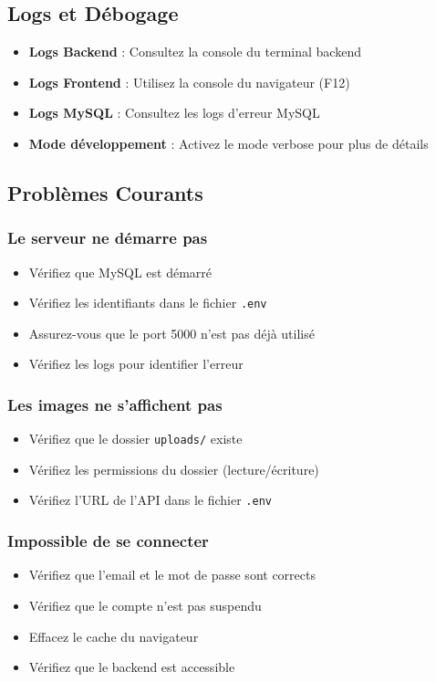 \documentclass[12pt,a4paper]{article}
\begin{document}
\subsection{Logs et Débogage}

\begin{itemize}[leftmargin=*]
    \item \textbf{Logs Backend} : Consultez la console du terminal backend
    \item \textbf{Logs Frontend} : Utilisez la console du navigateur (F12)
    \item \textbf{Logs MySQL} : Consultez les logs d'erreur MySQL
    \item \textbf{Mode développement} : Activez le mode verbose pour plus de détails
\end{itemize}

\subsection{Problèmes Courants}

\subsubsection{Le serveur ne démarre pas}
\begin{itemize}[leftmargin=*]
    \item Vérifiez que MySQL est démarré
    \item Vérifiez les identifiants dans le fichier \texttt{.env}
    \item Assurez-vous que le port 5000 n'est pas déjà utilisé
    \item Vérifiez les logs pour identifier l'erreur
\end{itemize}

\subsubsection{Les images ne s'affichent pas}
\begin{itemize}[leftmargin=*]
    \item Vérifiez que le dossier \texttt{uploads/} existe
    \item Vérifiez les permissions du dossier (lecture/écriture)
    \item Vérifiez l'URL de l'API dans le fichier \texttt{.env}
\end{itemize}

\subsubsection{Impossible de se connecter}
\begin{itemize}[leftmargin=*]
    \item Vérifiez que l'email et le mot de passe sont corrects
    \item Vérifiez que le compte n'est pas suspendu
    \item Effacez le cache du navigateur
    \item Vérifiez que le backend est accessible
\end{itemize}
\end{document}
